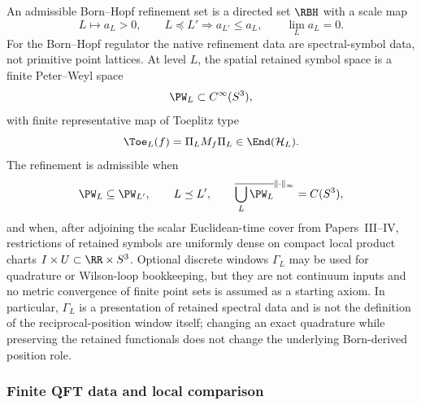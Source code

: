 \documentclass[12pt,a4paper]{article}
\begin{document}
\begin{definition}
\label{p12:def:admissible-refinement-set}
An admissible Born--Hopf refinement set is a directed set \(\RBH\) with a scale map
\[
L\longmapsto a_L>0,
\qquad
L\preceq L'\Rightarrow a_{L'}\le a_L,
\qquad
\lim_La_L=0.
\]
For the Born--Hopf regulator the native refinement data are spectral-symbol data, not primitive point lattices.  At level \(L\), the spatial retained symbol space is a finite Peter--Weyl space
\[
\PW_L\subset C^\infty(S^3),
\]
with finite representative map of Toeplitz type
\[
\Toe_L(f)=\Pi_LM_f\Pi_L\in\End(\mathcal H_L).
\]
The refinement is admissible when
\[
\PW_L\subseteq\PW_{L'},\qquad L\preceq L',
\qquad
\overline{\bigcup_L\PW_L}^{\|\cdot\|_\infty}=C(S^3),
\]
and when, after adjoining the scalar Euclidean-time cover from Papers~III--IV,
restrictions of retained symbols are uniformly dense on compact local product
charts \(I\times U\subset\RR\times S^3\).  Optional discrete windows
\(\Gamma_L\) may be used for quadrature or Wilson-loop bookkeeping, but they
are not continuum inputs and no metric convergence of finite point sets is
assumed as a starting axiom.  In particular, \(\Gamma_L\) is a presentation
of retained spectral data and is not the definition of the reciprocal-position
window itself; changing an exact quadrature while preserving the retained
functionals does not change the underlying Born-derived position role.
\end{definition}


\subsubsection{Finite QFT data and local comparison}
\label{p12:sec:finite-qft-local-comparison}
\end{document}

